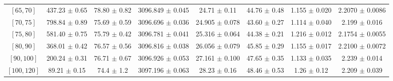 \begin{tabular}{c||c|c|c|c|c|c|c}
$[65, 70]$ & 437.23 $\pm$ 0.65 & 78.80 $\pm$ 0.82 & 3096.849 $\pm$ 0.045 & 24.71 $\pm$ 0.11 & 44.76 $\pm$ 0.48 & 1.155 $\pm$ 0.020 & 2.2070 $\pm$ 0.0086\\
$[70, 75]$ & 798.84 $\pm$ 0.89 & 75.69 $\pm$ 0.59 & 3096.696 $\pm$ 0.036 & 24.905 $\pm$ 0.078 & 43.60 $\pm$ 0.27 & 1.114 $\pm$ 0.040 & 2.199 $\pm$ 0.016\\
$[75, 80]$ & 581.40 $\pm$ 0.75 & 75.79 $\pm$ 0.42 & 3096.781 $\pm$ 0.041 & 25.316 $\pm$ 0.064 & 44.38 $\pm$ 0.21 & 1.216 $\pm$ 0.012 & 2.1754 $\pm$ 0.0055\\
$[80, 90]$ & 368.01 $\pm$ 0.42 & 76.57 $\pm$ 0.56 & 3096.816 $\pm$ 0.038 & 26.056 $\pm$ 0.079 & 45.85 $\pm$ 0.29 & 1.155 $\pm$ 0.017 & 2.2100 $\pm$ 0.0072\\
$[90, 100]$ & 200.24 $\pm$ 0.31 & 76.71 $\pm$ 0.67 & 3096.926 $\pm$ 0.053 & 27.161 $\pm$ 0.100 & 47.65 $\pm$ 0.35 & 1.133 $\pm$ 0.035 & 2.239 $\pm$ 0.014\\
$[100, 120]$ & 89.21 $\pm$ 0.15 & 74.4 $\pm$ 1.2 & 3097.196 $\pm$ 0.063 & 28.23 $\pm$ 0.16 & 48.46 $\pm$ 0.53 & 1.26 $\pm$ 0.12 & 2.209 $\pm$ 0.039\\
\end{tabular}
